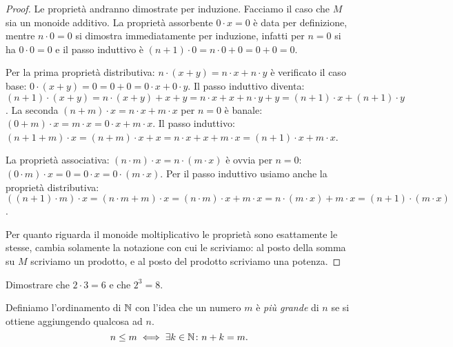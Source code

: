 \begin{proof}
Le proprietà andranno dimostrate per induzione.
Facciamo il caso che $M$ sia un monoide additivo.
La proprietà assorbente $0\cdot x = 0$ è data per definizione,
mentre $n\cdot 0 = 0$ si dimostra immediatamente 
per induzione, infatti per $n=0$ si ha $0\cdot 0 = 0$ 
e il passo induttivo è $(n+1)\cdot 0 = n\cdot 0 + 0 = 0 + 0 = 0$.

Per la prima proprietà distributiva: $n\cdot (x+y)=n\cdot x + n\cdot y$
è verificato il caso base: $0\cdot(x+y) = 0 = 0 + 0 = 0\cdot x + 0\cdot y$.
Il passo induttivo diventa: 
$(n+1)\cdot(x+y)
=n\cdot(x+y)+x+y
=n\cdot x + x + n\cdot y + y 
=(n+1)\cdot x + (n+1)\cdot y$.
La seconda $(n+m)\cdot x = n\cdot x + m\cdot x$
per $n=0$ è banale: $(0+m)\cdot x = m\cdot x = 0\cdot x + m\cdot x$.
Il passo induttivo:
$(n+1+m)\cdot x = (n+m)\cdot x + x 
= n\cdot x + x + m\cdot x
= (n+1)\cdot x + m\cdot x$.

La proprietà associativa: $(n\cdot m)\cdot x = n\cdot (m\cdot x)$
è ovvia per $n=0$: $(0\cdot m)\cdot x = 0 = 0\cdot x = 0\cdot (m\cdot x)$.
Per il passo induttivo usiamo anche la proprietà distributiva:
$((n+1)\cdot m)\cdot x 
= (n\cdot m+m)\cdot x 
= (n\cdot m)\cdot x + m\cdot x
= n\cdot (m\cdot x)+m\cdot x
= (n+1)\cdot (m\cdot x)$.

Per quanto riguarda il monoide moltiplicativo le proprietà sono esattamente 
le stesse, cambia solamente la notazione con cui le scriviamo:
al posto della somma su $M$ scriviamo un prodotto, e al posto del prodotto 
scriviamo una potenza. 
\end{proof}

\begin{exercise}
  Dimostrare che $2\cdot 3 = 6$ e che $2^3 = 8$.
\end{exercise}
  
Definiamo l'ordinamento di ${\mathbb N}$ 
con l'idea che un numero $m$ è \emph{più grande} di $n$ 
se si ottiene aggiungendo qualcosa ad $n$.
%
%
\[
    n\le m \iff \exists k\in {\mathbb N} \colon n+k = m.
\]

